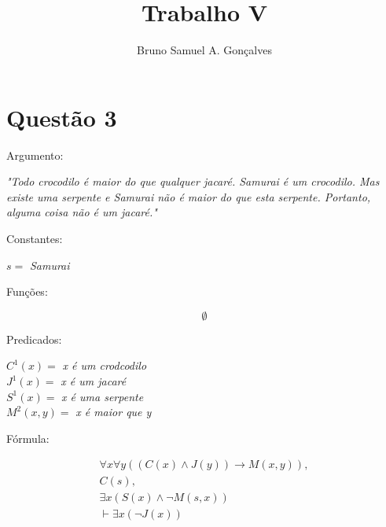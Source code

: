 \documentclass[12pt]{article}
\title{Trabalho V}
\author{Bruno Samuel A. Gonçalves}
\date{}
\begin{document}
\maketitle
\thispagestyle{empty}

\section{Questão 3}

\noindent Argumento:

\begin{center}
    \textit{"Todo crocodilo é maior do que qualquer jacaré. Samurai é um crocodilo. Mas existe uma serpente e Samurai não é maior do que esta serpente. Portanto, alguma coisa não é um jacaré."}
\end{center}

\noindent Constantes:

\begin{center}
    $s =$ \textit{Samurai}
\end{center}

\noindent Funções:

\[
    \emptyset
\]

\noindent Predicados:

\begin{center}
    $C^1(x) =$ \textit{x é um crodcodilo} \\
    $J^1(x) =$ \textit{x é um jacaré}  \\
    $S^1(x) =$ \textit{x é uma serpente}  \\
    $M^2(x, y) =$ \textit{x é maior que y}
\end{center}

\noindent Fórmula:

\begin{gather*}
    \forall x \forall y ((C(x) \land J(y)) \to M(x, y)), \\
    C(s), \\
    \exists x (S(x) \land \neg M(s, x)) \\
    \vdash \exists x (\neg J(x))
\end{gather*}
\end{document}
